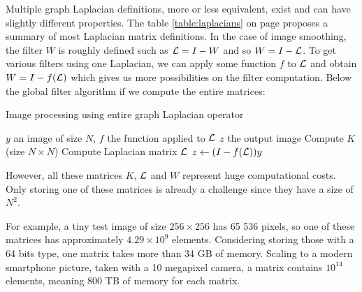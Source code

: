 Multiple graph Laplacian definitions, more or less equivalent, exist and can have slightly different properties.
\ifthesis
The table \ref{table:laplacians} on page \pageref{table:laplacians} proposes a summary of most Laplacian matrix definitions.
\fi
In the case of image smoothing, the filter \(W\) is roughly defined such as \(\operatorname{\mathcal{L}} = I - W\) \cite{siam_slides_2016} and so \(W = I - \operatorname{\mathcal{L}}\).
To get various filters using one Laplacian, we can apply some function \(f\) to \(\operatorname{\mathcal{L}}\) and obtain \(W = I - f(\operatorname{\mathcal{L}})\) which gives us more possibilities on the filter computation.
\ifthesis
 Below the global filter algorithm if we compute the entire matrices:

 \begin{algorithm}[H]
  \caption{Image processing using entire graph Laplacian operator}
  \begin{algorithmic}
   \REQUIRE \(y\) an image of size \(N\), \(f\) the function applied to \(\operatorname{\mathcal{L}}\)
   \ENSURE \(z\) the output image
   \STATE Compute \(K\) (size \(N \times N\))
   \STATE Compute Laplacian matrix \(\operatorname{\mathcal{L}}\)
   \STATE \(z \leftarrow (I - f(\operatorname{\mathcal{L}})) y\)
  \end{algorithmic}
 \end{algorithm}
\fi

However, all these matrices \(K\), \(\operatorname{\mathcal{L}}\) and \(W\) represent huge computational costs.
Only storing one of these matrices is already a challenge since they have a size of \(N^2\).

For example, a tiny test image of size \(256 \times 256\) has 65 536 pixels, so one of these matrices has approximately \(4.29 \times 10^9\) elements.
Considering storing those with a 64 bits type, one matrix takes more than 34 GB of memory.
Scaling to a modern smartphone picture, taken with a 10 megapixel camera, a matrix contains \(10^{14}\) elements, meaning 800 TB of memory for each matrix.
